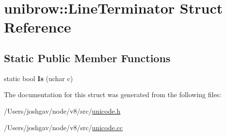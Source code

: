 \hypertarget{structunibrow_1_1_line_terminator}{}\section{unibrow\+:\+:Line\+Terminator Struct Reference}
\label{structunibrow_1_1_line_terminator}
\subsection*{Static Public Member Functions}
\begin{DoxyCompactItemize}
\item 
static bool {\bfseries Is} (uchar c)\hypertarget{structunibrow_1_1_line_terminator_a796904882c4db8a2e825de501309e58f}{}\label{structunibrow_1_1_line_terminator_a796904882c4db8a2e825de501309e58f}

\end{DoxyCompactItemize}


The documentation for this struct was generated from the following files\+:\begin{DoxyCompactItemize}
\item 
/\+Users/joshgav/node/v8/src/\hyperlink{unicode_8h}{unicode.\+h}\item 
/\+Users/joshgav/node/v8/src/\hyperlink{unicode_8cc}{unicode.\+cc}\end{DoxyCompactItemize}

